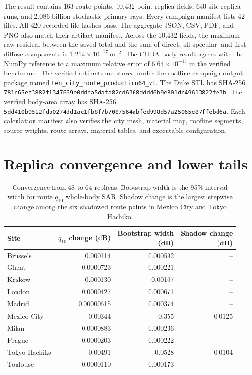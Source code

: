 The result contains 163 route points, 10,432 point-replica fields, 640
site-replica runs, and 2.086 billion stochastic primary rays. Every campaign
manifest lists 42 files. All 420 recorded file hashes pass. The aggregate JSON,
CSV, PDF, and PNG also match their artifact manifest. Across the 10,432 fields,
the maximum raw residual between the saved total and the sum of direct,
all-specular, and first-diffuse components is
$1.214\times10^{-17}\,\mathrm{m^{-2}}$. The CUDA body result agrees with the
NumPy reference to a maximum relative error of $6.64\times10^{-16}$ in the
verified benchmark. The verified artifacts are stored under
the roofline campaign output package named
\texttt{ten\_city\_route\_\allowbreak{}production64\_v1}.
The Duke STL has SHA-256
\texttt{781e65ef3882f134\allowbreak{}7669e0ddca5dafa82\allowbreak{}cd6368dddd6b9e80\allowbreak{}1dc49613822fe3b}.
The verified body-area array has SHA-256
\texttt{5dd410b9512fdb02\allowbreak{}74dd1ac1fb8f7b70\allowbreak{}87564abfed998d57\allowbreak{}a25065e87ffebd6a}.
Each calculation manifest also verifies the city mesh, material map, roofline
segments, source weights, route arrays, material tables, and executable configuration.

\section{Replica convergence and lower tails}
\label{sec:si-convergence}

\begin{table}[!t]
  \caption{Convergence from 48 to 64 replicas. Bootstrap width is the 95\% interval width for route $q_{10}$ whole-body SAR. Shadow change is the largest stepwise change among the six shadowed route points in Mexico City and Tokyo Hachiko.}
  \label{tab:si-convergence}
  \centering
  \begin{tabular}{lrrr}
    \toprule
    Site & \shortstack{$q_{10}$ change\\(dB)} & \shortstack{Bootstrap width\\(dB)} & \shortstack{Shadow change\\(dB)} \\
    \midrule
    Brussels & 0.000114 & 0.000592 & -- \\
    Ghent & 0.0000723 & 0.000221 & -- \\
    Krakow & 0.000130 & 0.00107 & -- \\
    London & 0.0000427 & 0.000671 & -- \\
    Madrid & 0.00000615 & 0.000374 & -- \\
    Mexico City & 0.00344 & 0.355 & 0.0125 \\
    Milan & 0.0000883 & 0.000236 & -- \\
    Prague & 0.0000203 & 0.000222 & -- \\
    Tokyo Hachiko & 0.00491 & 0.0528 & 0.0104 \\
    Toulouse & 0.0000110 & 0.000173 & -- \\
    \bottomrule
  \end{tabular}
\end{table}


